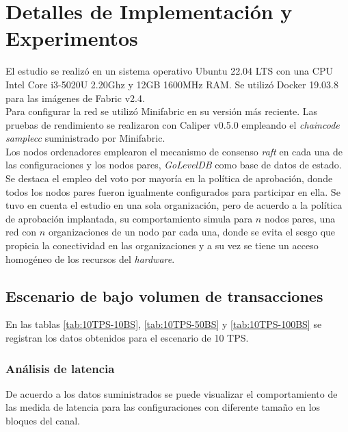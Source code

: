 \chapter{Detalles de Implementación y Experimentos}\label{chapter:implementation}

El estudio se realiz\'o en un sistema operativo Ubuntu 22.04 LTS con una CPU Intel Core i3-5020U 2.20Ghz y 12GB 1600MHz RAM. Se utiliz\'o Docker 19.03.8 para las im\'agenes de Fabric v2.4.\\

Para configurar la red se utiliz\'o Minifabric en su versi\'on m\'as reciente. Las pruebas de rendimiento se realizaron con Caliper v0.5.0 empleando el \emph{chaincode} \emph{samplecc} suministrado por Minifabric.\\

Los nodos ordenadores emplearon el mecanismo de consenso \emph{raft} en cada una de las configuraciones y los nodos pares, \emph{GoLevelDB} como base de datos de estado. Se destaca el empleo del voto por mayor\'ia en la pol\'itica de aprobaci\'on, donde todos los nodos pares fueron igualmente configurados para participar en ella. Se tuvo en cuenta el estudio en una sola organizaci\'on, pero de acuerdo a la pol\'itica de aprobaci\'on implantada, su comportamiento simula para $n$ nodos pares, una red con $n$ organizaciones de un nodo par cada una, donde se evita el sesgo que propicia la conectividad en las organizaciones y a su vez se tiene un acceso homog\'eneo de los recursos del \emph{hardware}.

\newpage
\section{Escenario de bajo volumen de transacciones}

En las tablas \ref{tab:10TPS-10BS}, \ref{tab:10TPS-50BS} y \ref{tab:10TPS-100BS} se registran los datos obtenidos para el escenario de 10 TPS.\\

\subsection{An\'alisis de latencia}
De acuerdo a los datos suministrados se puede visualizar el comportamiento de las medida de latencia para las configuraciones con diferente tama\~no en los bloques del canal.\\

